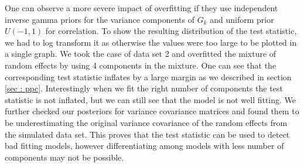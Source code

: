 One can observe a more severe impact of overfitting if they use independent inverse gamma priors for the variance components of $G_k$ and uniform prior $U(-1,1)$ for correlation. To show the resulting distribution of the test statistic, we had to log transform it as otherwise the values were too large to be plotted in a single graph. We took the case of data set 2 and overfitted the mixture of random effects by using 4 components in the mixture. One can see that the corresponding test statistic inflates by a large margin as we described in section \ref{sec : ppc}. Interestingly when we fit the right number of components the test statistic is not inflated, but we can still see that the model is not well fitting. We further checked our posteriors for variance covariance matrices and found them to be underestimating the original variance covariance of the random effects from the simulated data set. This proves that the test statistic can be used to detect bad fitting models, however differentiating among models with less number of components may not be possible.

